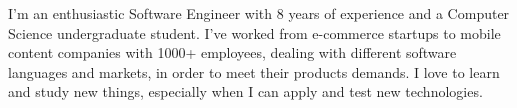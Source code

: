 %
%
%

\par{
	I'm an enthusiastic Software Engineer with 8 years of experience
	and a Computer Science undergraduate student.
	I've worked from e-commerce startups to mobile content companies with 1000+ employees,
	dealing with different software languages and markets, in order to meet their products demands.
	I love to learn and study new things, especially when I can apply and test new technologies.\\
}
